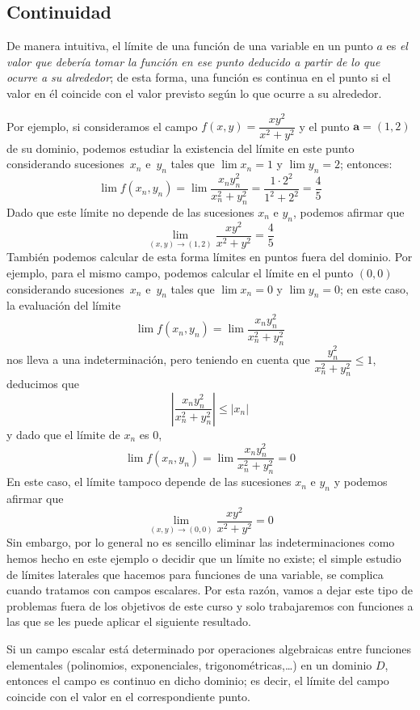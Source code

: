 \subsection{Continuidad}%

De manera intuitiva, el límite de una función de una variable en un punto $a$ es \emph{el valor que debería tomar la función en ese punto deducido a partir de lo que ocurre a su alrededor}; de esta forma, una función es continua en el punto si el valor en él coincide con el valor previsto según lo que ocurre a su alrededor.

Por ejemplo, si consideramos el campo $f(x,y)=\dfrac{xy^2}{x^2+y^2}$ y el punto $\boldsymbol a=(1,2)$ de su dominio, podemos estudiar la existencia del límite en este punto considerando sucesiones~$x_n$ e~$y_n$ tales que $\lim x_n=1$ y $\lim y_n=2$; entonces:
\[
\lim f(x_n,y_n)=\lim\frac{x_ny_n^2}{x_n^2+y_n^2}=\frac{1\cdot 2^2}{1^2+2^2}=\frac45
\]
Dado que este límite no depende de las sucesiones $x_n$ e $y_n$, podemos afirmar que
\[
\lim_{(x,y)\to(1,2)}\frac{xy^2}{x^2+y^2} =\dfrac45
\]
%
También podemos calcular de esta forma límites en puntos fuera del dominio.
Por ejemplo, para el mismo campo, podemos calcular el límite en el punto $(0,0)$ considerando sucesiones~$x_n$ e~$y_n$ tales que $\lim x_n=0$ y $\lim y_n=0$; en este caso, la evaluación del límite
\[
\lim f(x_n,y_n)=\lim\frac{x_ny_n^2}{x_n^2+y_n^2}
\]
nos lleva a una indeterminación, pero teniendo en cuenta que $
\dfrac{y_n^2}{x_n^2+y_n^2}\le 1$, deducimos que
\[
\left|\frac{x_ny_n^2}{x_n^2+y_n^2}\right|\le |x_n|
\]
y dado que el límite de $x_n$ es 0,
\[
\lim f(x_n,y_n)=\lim\frac{x_ny_n^2}{x_n^2+y_n^2}=0
\]
En este caso, el límite tampoco depende de las sucesiones $x_n$ e $y_n$ y podemos afirmar que
\[
\lim_{(x,y)\to (0,0)}\frac{xy^2}{x^2+y^2} =0
\]
Sin embargo, por lo general no es sencillo eliminar las indeterminaciones como hemos hecho en este ejemplo o decidir que un límite no existe;
el simple estudio de límites laterales que hacemos para funciones de una variable, se complica cuando tratamos con campos escalares.
Por esta razón, vamos a dejar este tipo de problemas fuera de los objetivos de este curso y solo trabajaremos con funciones a las que se les puede aplicar el siguiente resultado.
%
\begin{corolario}
Si un campo escalar está determinado por operaciones algebraicas entre funciones elementales (polinomios, exponenciales, trigonométricas,\dots) en un dominio $\mathit{D}$, entonces el campo es continuo en dicho dominio; es decir, el límite del campo coincide con el valor en el correspondiente punto.
\end{corolario}

